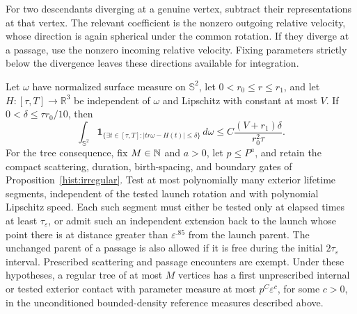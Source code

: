 For two descendants diverging at a genuine vertex, subtract their
representations at that vertex.  The relevant coefficient is the nonzero
outgoing relative velocity, whose direction is again spherical under the
common rotation.  If they diverge at a passage, use the nonzero incoming
relative velocity.  Fixing parameters strictly below the divergence leaves
these directions available for integration.

\begin{lemma}
\label{exp:tube}
Let $\omega$ have normalized surface measure on $\mathbb S^2$, let
$0<r_0\le r\le r_1$, and let $H:[\tau,T]\to\mathbb R^3$ be independent of
$\omega$ and Lipschitz with constant at most $V$.  If $0<\delta\le\tau r_0/10$,
then
\begin{equation}
\label{exp:tube-bound}
 \int_{\mathbb S^2}\mathbf1_{\{\exists t\in[\tau,T]:
 |tr\omega-H(t)|\le\delta\}}\,d\omega
 \le C\frac{(V+r_1)\delta}{r_0^2\tau}.
\end{equation}
For the tree consequence, fix $M\in\mathbb N$ and $a>0$, let $p\le P^a$,
and retain the compact scattering, duration, birth-spacing, and boundary
gates of Proposition~\ref{hist:irregular}. Test at most polynomially many
exterior lifetime segments, independent of the tested launch rotation and
with polynomial Lipschitz speed. Each such segment must either be tested
only at elapsed times at least $\tau_\varepsilon$, or admit such an
independent extension back to the launch whose point there is at distance
greater than $\varepsilon^{.85}$ from the launch parent. The unchanged
parent of a passage is also allowed if it is free during the initial
$2\tau_\varepsilon$ interval. Prescribed scattering and passage encounters
are exempt. Under these hypotheses, a regular tree of at most $M$ vertices
has a first unprescribed internal or tested exterior contact with parameter
measure at most $p^C\varepsilon^c$, for some $c>0$, in the unconditioned
bounded-density reference measures described above.
\end{lemma}

